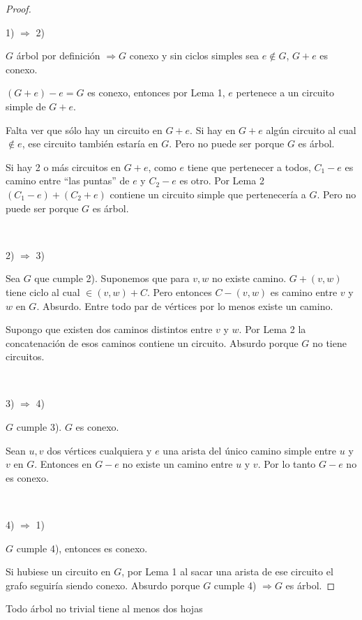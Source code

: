 \begin{proof}
~

1) $\Longrightarrow$ 2)

$G$ árbol por definición $\Longrightarrow G$ conexo y sin ciclos simples sea $e \notin G$, $G + e$ es conexo.

$(G + e) - e = G$ es conexo, entonces por Lema 1, $e$ pertenece a un circuito simple de $G + e$.

Falta ver que sólo hay un circuito en $G + e$. Si hay en $G + e$ algún circuito al cual $\notin e$, ese circuito también estaría en $G$. Pero no puede ser porque $G$ es árbol.

Si hay 2 o más circuitos en $G + e$, como $e$ tiene que pertenecer a todos, $C_1 - e$ es camino entre ``las puntas'' de $e$ y $C_2 - e$ es otro. Por Lema 2 $(C_1 - e) + (C_2 + e)$ contiene un circuito simple que pertenecería a $G$. Pero no puede ser porque $G$ es árbol. 

~

2) $\Longrightarrow$ 3)

Sea $G$ que cumple 2). Suponemos que para $v, w$ no existe camino. $G + (v, w)$ tiene ciclo al cual $\in (v, w) + C$. Pero entonces $C - (v, w)$ es camino entre $v$ y $w$ en $G$. Absurdo. Entre todo par de vértices por lo menos existe un camino.

Supongo que existen dos caminos distintos entre $v$ y $w$. Por Lema 2 la concatenación de esos caminos contiene un circuito. Absurdo porque $G$ no tiene circuitos.

~

3) $\Longrightarrow$ 4)

$G$ cumple 3). $G$ es conexo.

Sean $u, v$ dos vértices cualquiera y $e$ una arista del único camino simple entre $u$ y $v$ en $G$. Entonces en $G - e$ no existe un camino entre $u$ y $v$. Por lo tanto $G - e$ no es conexo.

~

4) $\Longrightarrow$ 1)

$G$ cumple 4), entonces es conexo.

Si hubiese un circuito en $G$, por Lema 1 al sacar una arista de ese circuito el grafo seguiría siendo conexo. Absurdo porque $G$ cumple 4) $\Longrightarrow G$ es árbol.
\end{proof}
\begin{lema}[Hojas]
    Todo árbol no trivial tiene al menos dos hojas
\end{lema}

